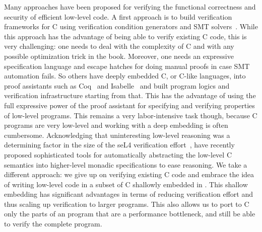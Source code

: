 \documentclass[acmsmall,review,anonymous]{acmart}\settopmatter{printfolios=true}
\begin{document}
Many approaches have been proposed for verifying the functional
correctness and security of efficient low-level code.
%
A first approach is to build verification frameworks for C using
verification condition generators and SMT solvers~\cite{Kirchner:2015,
  cohen2009vcc, verifast}.
%
While this approach has the advantage of being able to verify existing
C code, this is very challenging: one needs to deal with the
complexity of C and with any possible optimization trick in the book.
%
Moreover, one needs an expressive specification language and escape
hatches for doing manual proofs in case SMT automation fails.
%
So others have deeply embedded C, or C-like languages, into proof
assistants such as Coq~\cite{beringer2015verified,
  Appel15, ChenWSLG16} and Isabelle~\cite{WinwoodKSACN09,
  Schirmer2006} and built program logics and verification
infrastructure starting from that.
%
This has the advantage of using the full expressive power of the proof
assistant for specifying and verifying properties of low-level programs.
%
This remains a very labor-intensive task though, because C programs
are very low-level and working with a deep embedding is often cumbersome.
%
Acknowledging that uninteresting low-level reasoning was a determining
factor in the size of the seL4 verification effort~\cite{Klein09sel4:formal},
\citet{GreenawayLAK14, GreenawayAK12} have recently
proposed sophisticated tools for automatically abstracting the
low-level C semantics into higher-level monadic specifications to ease reasoning.
%
We take a different approach: we give up on verifying existing C code
and embrace the idea of writing low-level code in a subset of C
shallowly embedded in \fstar{}.
%
This shallow embedding has significant advantages in terms of reducing
verification effort and thus scaling up verification to larger programs.
%
This also allows us to port to C only the parts of an \fstar program
that are a performance bottleneck, and still be able to verify the
complete program.


\end{document}
